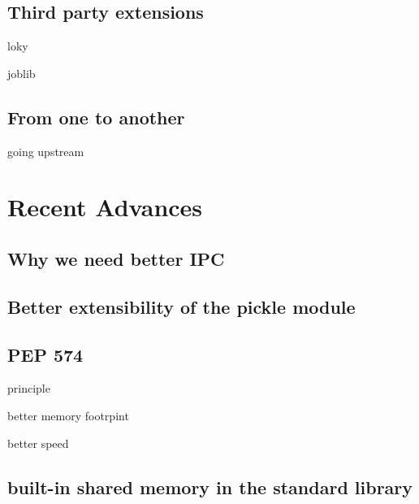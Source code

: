 \documentclass[13pt, usenames,dvipsnames]{beamer} %
\begin{document}
    \subsection{Third party extensions}
        \begin{frame}[t]{loky}

        \end{frame}
        \begin{frame}[t]{joblib}

        \end{frame}
    \subsection{From one to another}
        \begin{frame}[t]{going upstream}

        \end{frame}

\section{Recent Advances}
\subsection{Why we need better IPC}
\subsection{Better extensibility of the pickle module}
\subsection{PEP 574}
    \begin{frame}[t]{principle}
    \end{frame}

    \begin{frame}[t]{better memory footrpint}
    \end{frame}

    \begin{frame}[t]{better speed}
    \end{frame}
\subsection{built-in shared memory in the standard library}



\begin{frame}[fragile]{}
    \begin{beamerboxesrounded}{}
        \inputminted[fontfamily=fvm, bgcolor=beige]{python}{scripts/test_script.py}
    \end{beamerboxesrounded}
\end{frame}
\end{document}
